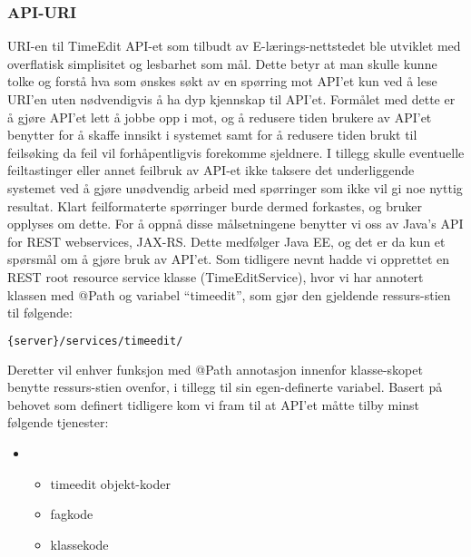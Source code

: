 \documentclass[../main.tex]{subfiles}
\begin{document}
\subsubsection{API-URI}

URI-en til TimeEdit API-et som tilbudt av E-lærings-nettstedet ble utviklet med overflatisk simplisitet og lesbarhet som mål. Dette betyr at man skulle kunne tolke og forstå hva som ønskes søkt av en spørring mot API’et kun ved å lese URI’en uten nødvendigvis å ha dyp kjennskap til API’et. Formålet med dette er å gjøre API’et lett å jobbe opp i mot, og å redusere tiden brukere av API’et benytter for å skaffe innsikt i systemet samt for å redusere tiden brukt til feilsøking da feil vil forhåpentligvis forekomme sjeldnere.\newline
I tillegg skulle eventuelle feiltastinger eller annet feilbruk av API-et ikke taksere det underliggende systemet ved å gjøre unødvendig arbeid med spørringer som ikke vil gi noe nyttig resultat. Klart feilformaterte spørringer burde dermed forkastes, og bruker opplyses om dette.\newline
\newline
For å oppnå disse målsetningene benytter vi oss av Java’s API for REST webservices, JAX-RS. Dette medfølger Java EE, og det er da kun et spørsmål om å gjøre bruk av API’et.
Som tidligere nevnt hadde vi opprettet en REST root resource service klasse (TimeEditService), hvor vi har annotert klassen med @Path og variabel “timeedit”, som gjør den gjeldende ressurs-stien til følgende:

\begin{lstlisting}[language=HTML, frame=single, caption={asdasdsadasdasdasdsadsadasdasdsadsa}]
{server}/services/timeedit/
\end{lstlisting}

Deretter vil enhver funksjon med @Path annotasjon innenfor klasse-skopet benytte ressurs-stien ovenfor, i tillegg til sin egen-definerte variabel.
Basert på behovet som definert tidligere kom vi fram til at API’et måtte tilby minst følgende tjenester:

\begin{itemize}
\item
\begin{itemize}
\item timeedit objekt-koder
\item fagkode
\item klassekode
\end{itemize}
\end{itemize}
\end{document}

